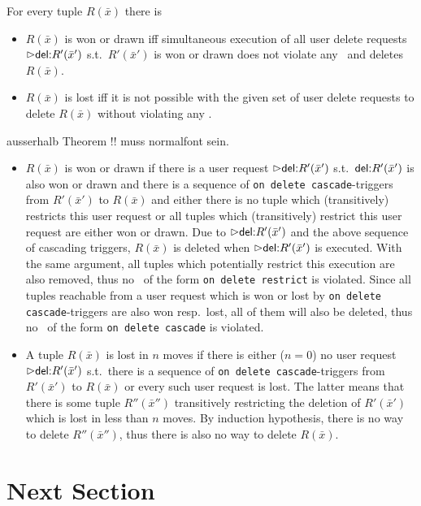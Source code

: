 \documentclass[twoside,11pt]{article}
\theoremstyle{lines}
\theoremstyle{longplain}
\begin{document}
\begin{Theorem}\label{theo:game}
For every tuple $R(\bar x)$ there is
\begin{itemize}
\item $R(\bar x)$ is won or drawn iff simultaneous execution of
all user delete requests $\extev \del R'(\bar x')$ s.t.\ $R'(\bar x')$
is won or drawn does not violate any \ric\ and deletes $R(\bar x)$.
\item $R(\bar x)$ is lost iff it is not possible with the given set
of user delete requests to delete $R(\bar x)$ without violating any
\ric.
\end{itemize}
\end{Theorem}

ausserhalb Theorem !! muss normalfont sein.
\begin{Proof}
\begin{itemize}
\item $R(\bar x)$ is won or drawn if there is a user request
 $\extev \del R'(\bar x')$ s.t.\ ${\textsf{del:}} R'(\bar x')$ is also won or drawn
 and there is a sequence of \texttt{on delete cascade}-triggers from
 $R'(\bar x')$ to $R(\bar x)$ and either there is no tuple which
 (transitively) restricts this user request or all tuples which
 (transitively) restrict this user request are either won or drawn.
 Due to $\extev \del R'(\bar x')$ and the above sequence
 of cascading triggers, $R(\bar x)$ is deleted when
 $\extev \del R'(\bar x')$ is executed.
 With the same argument, all tuples which potentially restrict this
 execution are also removed, thus no \ric\ of the form
 \texttt{on delete restrict} is violated.
 Since all tuples reachable from a user request which is won or lost by
 \texttt{on delete cascade}-triggers are also won resp.\ lost, all of
 them will also be deleted, thus no \ric\ of the form
 \texttt{on delete cascade} is violated.
\item A tuple $R(\bar x)$ is lost in $n$ moves if there is either
 ($n=0$) no user request $\extev \del R'(\bar x')$ s.t.\ there is a
 sequence of \texttt{on delete cascade}-triggers from $R'(\bar x')$
 to $R(\bar x)$ or every such user request is lost.
 The latter means that there is some tuple $R''(\bar x'')$ transitively
 restricting the deletion of $R'(\bar x')$ which is lost in less than
 $n$ moves. By induction hypothesis, there is no way to delete
 $R''(\bar x'')$, thus there is also no way to delete $R(\bar x)$.
\end{itemize}
\end{Proof}

\section{Next Section}
\end{document}
